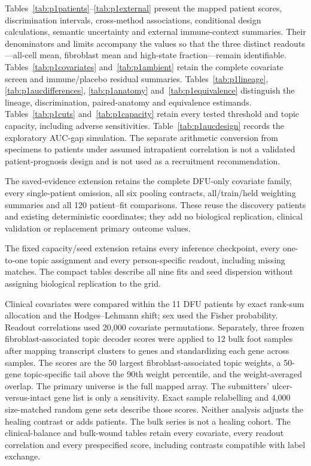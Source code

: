 Tables~\ref{tab:p1patients}--\ref{tab:p1external} present the mapped patient scores, discrimination intervals, cross-method associations, conditional design calculations, semantic uncertainty and external immune-context summaries. Their denominators and limits accompany the values so that the three distinct readouts---all-cell mean, fibroblast mean and high-state fraction---remain identifiable.
Tables~\ref{tab:p1covariates} and~\ref{tab:p1ambient} retain the complete covariate screen and immune/placebo residual summaries. Tables~\ref{tab:p1lineage}, \ref{tab:p1aucdifferences}, \ref{tab:p1anatomy} and~\ref{tab:p1equivalence} distinguish the lineage, discrimination, paired-anatomy and equivalence estimands. Tables~\ref{tab:p1cuts} and~\ref{tab:p1capacity} retain every tested threshold and topic capacity, including adverse sensitivities. Table~\ref{tab:p1aucdesign} records the exploratory AUC-gap simulation. The separate arithmetic conversion from specimens to patients under assumed intrapatient correlation is not a validated patient-prognosis design and is not used as a recruitment recommendation.
{\renewcommand{\arraystretch}{1.00}}

The saved-evidence extension retains the complete DFU-only covariate family, every single-patient omission, all six pooling contracts, all/train/held weighting summaries and all 120 patient--fit comparisons. These reuse the discovery patients and existing deterministic coordinates; they add no biological replication, clinical validation or replacement primary outcome values.
{\renewcommand{\arraystretch}{0.88}}

The fixed capacity/seed extension retains every inference checkpoint, every one-to-one topic assignment and every person-specific readout, including missing matches. The compact tables describe all nine fits and seed dispersion without assigning biological replication to the grid.
{\small\renewcommand{\arraystretch}{1.0}}

Clinical covariates were compared within the 11 DFU patients by exact rank-sum allocation and the Hodges--Lehmann shift; sex used the Fisher probability. Readout correlations used 20,000 covariate permutations. Separately, three frozen fibroblast-associated topic decoder scores were applied to 12 bulk foot samples after mapping transcript clusters to genes and standardizing each gene across samples. The scores are the 50 largest fibroblast-associated topic weights, a 50-gene topic-specific tail above the 90th weight percentile, and the weight-averaged overlap. The primary universe is the full mapped array. The submitters' ulcer-versus-intact gene list is only a sensitivity. Exact sample relabelling and 4,000 size-matched random gene sets describe those scores. Neither analysis adjusts the healing contrast or adds patients. The bulk series is not a healing cohort.
The clinical-balance and bulk-wound tables retain every covariate, every readout correlation and every prespecified score, including contrasts compatible with label exchange.
{\small\renewcommand{\arraystretch}{1.0}}
